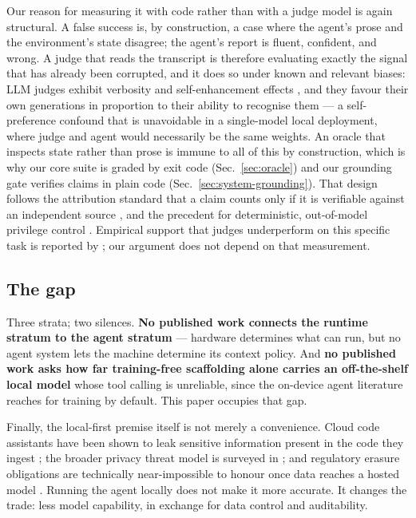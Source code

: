 \documentclass[11pt,a4paper]{article}
\begin{document}
Our reason for measuring it with code rather than with a judge model is again
structural. A false success is, by construction, a case where the agent's prose
and the environment's state disagree; the agent's report is fluent, confident,
and wrong. A judge that reads the transcript is therefore evaluating exactly the
signal that has already been corrupted, and it does so under known and relevant
biases: LLM judges exhibit verbosity and self-enhancement effects
\citep{zheng2023judging}, and they favour their own generations in proportion to
their ability to recognise them \citep{panickssery2024llmevaluators} --- a
self-preference confound that is unavoidable in a single-model local deployment,
where judge and agent would necessarily be the same weights. An oracle that
inspects state rather than prose is immune to all of this by construction, which
is why our core suite is graded by exit code (Sec.~\ref{sec:oracle}) and our
grounding gate verifies claims in plain code (Sec.~\ref{sec:system-grounding}).
That design follows the attribution standard that a claim counts only if it is
verifiable against an independent source \citep{rashkin2023attribution}, and the
precedent for deterministic, out-of-model privilege control
\citep{shi2025progent,ruan2024toolemu}. Empirical support that judges
underperform on this specific task is reported by \citet{advani2026falsesuccess};
our argument does not depend on that measurement.

\subsection{The gap}

Three strata; two silences. \textbf{No published work connects the runtime
stratum to the agent stratum} --- hardware determines what can run, but no agent
system lets the machine determine its context policy. And \textbf{no published
work asks how far training-free scaffolding alone carries an off-the-shelf local
model} whose tool calling is unreliable, since the on-device agent literature
reaches for training by default. This paper occupies that gap.

Finally, the local-first premise itself is not merely a convenience. Cloud code
assistants have been shown to leak sensitive information present in the code they
ingest \citep{niu2023codexleaks}; the broader privacy threat model is surveyed in
\citet{miranda2025privacy}; and regulatory erasure obligations are technically
near-impossible to honour once data reaches a hosted model
\citep{zhang2024rtbf}. Running the agent locally does not make it more accurate.
It changes the trade: less model capability, in exchange for data control and
auditability.
\end{document}

